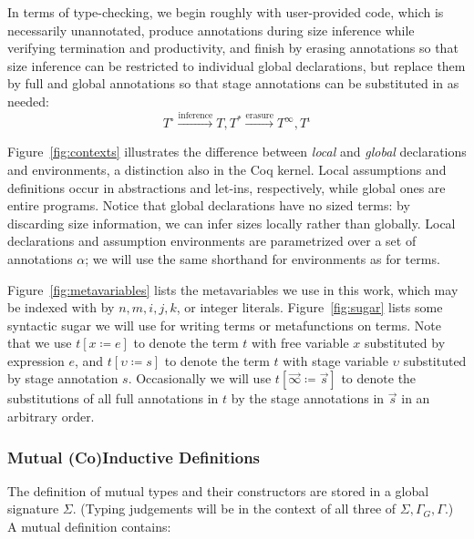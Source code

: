 \documentclass[sigplan,10pt,anonymous,review,nonacm]{acmart}
\begin{document}
In terms of type-checking, we begin roughly with user-provided code, which is necessarily unannotated, produce annotations during size inference while verifying termination and productivity, and finish by erasing annotations so that size inference can be restricted to individual global declarations, but replace them by full and global annotations so that stage annotations can be substituted in as needed:
\begin{equation*}
    T^\circ \xrightarrow{\text{inference}} T, T^* \xrightarrow{\text{erasure}} T^\infty, T^\iota
\end{equation*}



Figure~\ref{fig:contexts} illustrates the difference between \textit{local} and \textit{global} declarations and environments, a distinction also in the Coq kernel. Local assumptions and definitions occur in abstractions and let-ins, respectively, while global ones are entire programs. Notice that global declarations have no sized terms: by discarding size information, we can infer sizes locally rather than globally. Local declarations and assumption environments are parametrized over a set of annotations $\alpha$; we will use the same shorthand for environments as for terms.





Figure~\ref{fig:metavariables} lists the metavariables we use in this work, which may be indexed with by $n, m, i, j, k$, or integer literals. Figure~\ref{fig:sugar} lists some syntactic sugar we will use for writing terms or metafunctions on terms. Note that we use $t[x \coloneqq e]$ to denote the term $t$ with free variable $x$ substituted by expression $e$, and $t[\upsilon \coloneqq s]$ to denote the term $t$ with stage variable $\upsilon$ substituted by stage annotation $s$. Occasionally we will use $t[\vec{\infty} \coloneqq \vec{s}]$ to denote the substitutions of all full annotations in $t$ by the stage annotations in $\vec{s}$ in an arbitrary order.

\subsubsection{Mutual (Co)Inductive Definitions}



The definition of mutual \coinductive types and their constructors are stored in a global signature $\Sigma$. (Typing judgements will be in the context of all three of $\Sigma, \Gamma_G, \Gamma$.) A mutual \coinductive definition contains:
\end{document}
